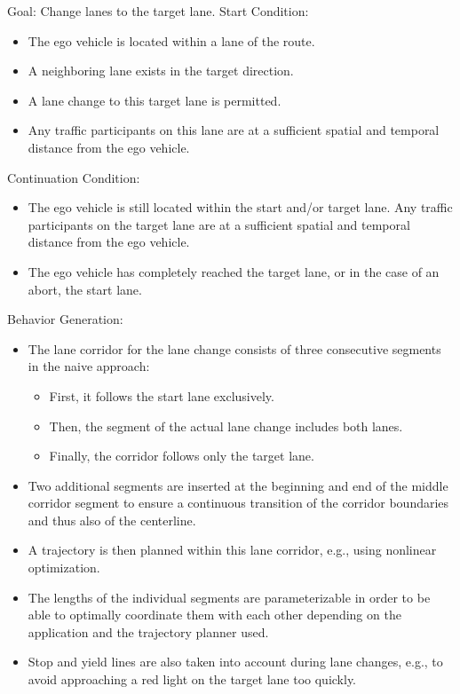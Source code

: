     Goal: Change lanes to the target lane.
    Start Condition:

\begin{itemize}
    \item The ego vehicle is located within a lane of the route.
    \item A neighboring lane exists in the target direction.
    \item A lane change to this target lane is permitted.
    \item Any traffic participants on this lane are at a sufficient spatial and temporal distance from the ego vehicle.
\end{itemize}

    Continuation Condition:

\begin{itemize}
\item The ego vehicle is still located within the start and/or target lane.
        Any traffic participants on the target lane are at a sufficient spatial and temporal distance from the ego vehicle.
\item The ego vehicle has completely reached the target lane, or in the case of an abort, the start lane.
\end{itemize}

    Behavior Generation:

\begin{itemize}
    \item The lane corridor for the lane change consists of three consecutive segments in the naive approach:
          \begin{itemize}
              \item First, it follows the start lane exclusively.
              \item Then, the segment of the actual lane change includes both lanes.
              \item Finally, the corridor follows only the target lane.
          \end{itemize}
    \item Two additional segments are inserted at the beginning and end of the middle corridor segment to ensure a continuous transition of the corridor boundaries and thus also of the centerline.
    \item A trajectory is then planned within this lane corridor, e.g., using nonlinear optimization.
    \item The lengths of the individual segments are parameterizable in order to be able to optimally coordinate them with each other depending on the application and the trajectory planner used.
    \item Stop and yield lines are also taken into account during lane changes, e.g., to avoid approaching a red light on the target lane too quickly.
\end{itemize}

